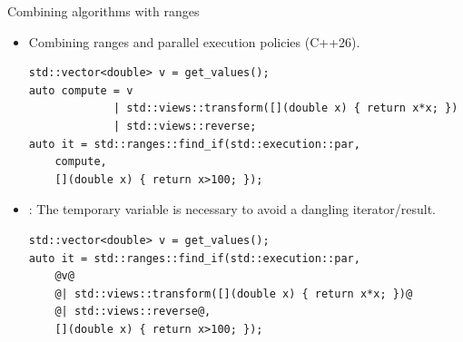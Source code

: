 \begin{frame}[t,fragile]{Combining algorithms with ranges}
\begin{itemize}

    \item Combining ranges and parallel execution policies (C++26).
\begin{lstlisting}
std::vector<double> v = get_values();
auto compute = v 
             | std::views::transform([](double x) { return x*x; })
             | std::views::reverse;
auto it = std::ranges::find_if(std::execution::par, 
    compute, 
    [](double x) { return x>100; });
\end{lstlisting}

     \item {}: The temporary variable  is necessary to avoid a dangling iterator/result. 
\begin{lstlisting}
std::vector<double> v = get_values();
auto it = std::ranges::find_if(std::execution::par, 
    @v@
    @| std::views::transform([](double x) { return x*x; })@
    @| std::views::reverse@,
    [](double x) { return x>100; });
\end{lstlisting}

\end{itemize}
\end{frame}